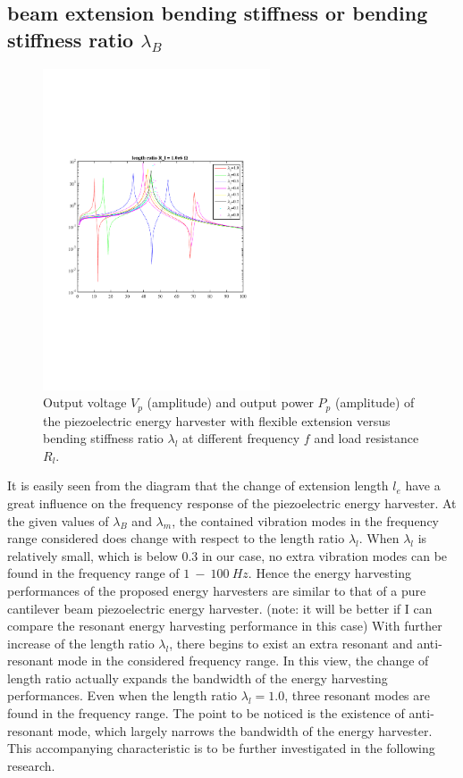 \documentclass{elsarticle}
\begin{document}
\subsection{beam extension bending stiffness or bending stiffness ratio $\lambda_B$}


\begin{figure}[!htbp]
    \centering
    \includegraphics[width=0.6\textwidth]{./fig_laml_vol_versus_fr_Rl}
    \caption{Output voltage $V_p$ (amplitude) and output power $P_p$ (amplitude) of the piezoelectric energy harvester with flexible extension versus bending stiffness ratio $\lambda_l$ at different frequency $f$ and load resistance $R_l$. }
    \label{fig:fig_lamB_vol_versus_fr_Rl}
\end{figure}

It is easily seen from the diagram that the change of extension length $l_e$ have a great influence on the frequency response of the piezoelectric energy harvester. At the given values of $\lambda_B$ and $\lambda_m$, the contained vibration modes in the frequency range considered does change with respect to
the length ratio $\lambda_l$. When $\lambda_l$ is relatively small, which is below $0.3$ in our case, no extra vibration modes can be found in the frequency range of $1\ - \ 100\ Hz$. Hence the energy harvesting performances of the proposed energy harvesters are similar to that of a pure cantilever beam piezoelectric energy harvester. (note: it will be better if I can compare the resonant energy harvesting performance in this case) With further increase of the length ratio $\lambda_l$, there begins to exist an extra resonant and anti-resonant mode in the considered frequency range. In this view, the change of length ratio actually expands the bandwidth of the energy harvesting performances. Even when the length ratio $\lambda_l = 1.0$, three resonant modes are found in the frequency range. The point to be noticed is the existence of anti-resonant mode, which largely narrows the bandwidth of the energy harvester. This accompanying characteristic is to be further investigated in the following research. 
\end{document}
